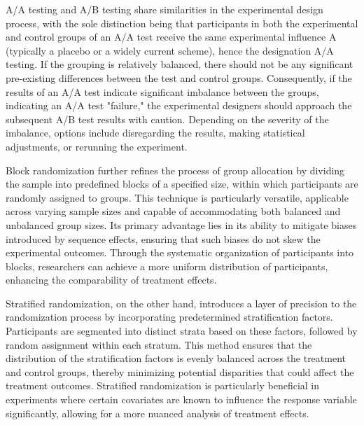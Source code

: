 \begin{digest}
A/A testing and A/B testing share similarities in the experimental design process, with the sole distinction being that participants in both the experimental and control groups of an A/A test receive the same experimental influence A (typically a placebo or a widely current scheme), hence the designation A/A testing. If the grouping is relatively balanced, there should not be any significant pre-existing differences between the test and control groups. Consequently, if the results of an A/A test indicate significant imbalance between the groups, indicating an A/A test "failure," the experimental designers should approach the subsequent A/B test results with caution. Depending on the severity of the imbalance, options include disregarding the results, making statistical adjustments, or rerunning the experiment.

Block randomization further refines the process of group allocation by dividing the sample into predefined blocks of a specified size, within which participants are randomly assigned to groups. This technique is particularly versatile, applicable across varying sample sizes and capable of accommodating both balanced and unbalanced group sizes. Its primary advantage lies in its ability to mitigate biases introduced by sequence effects, ensuring that such biases do not skew the experimental outcomes. Through the systematic organization of participants into blocks, researchers can achieve a more uniform distribution of participants, enhancing the comparability of treatment effects.

Stratified randomization, on the other hand, introduces a layer of precision to the randomization process by incorporating predetermined stratification factors. Participants are segmented into distinct strata based on these factors, followed by random assignment within each stratum. This method ensures that the distribution of the stratification factors is evenly balanced across the treatment and control groups, thereby minimizing potential disparities that could affect the treatment outcomes. Stratified randomization is particularly beneficial in experiments where certain covariates are known to influence the response variable significantly, allowing for a more nuanced analysis of treatment effects.


\end{digest}
